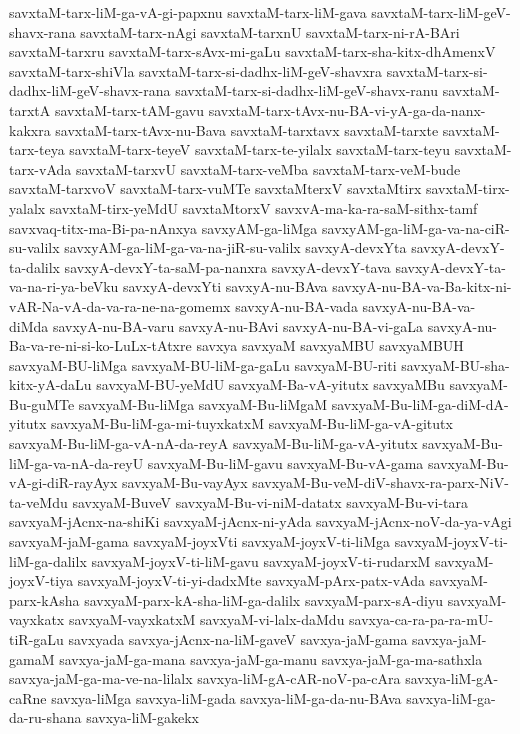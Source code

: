 {savxtaM-tarx-liM-ga-vA-gi-papxnu
savxtaM-tarx-liM-gava
savxtaM-tarx-liM-geV-shavx-rana
savxtaM-tarx-nAgi
savxtaM-tarxnU
savxtaM-tarx-ni-rA-BAri
savxtaM-tarxru
savxtaM-tarx-sAvx-mi-gaLu
savxtaM-tarx-sha-kitx-dhAmenxV
savxtaM-tarx-shiVla
savxtaM-tarx-si-dadhx-liM-geV-shavxra
savxtaM-tarx-si-dadhx-liM-geV-shavx-rana
savxtaM-tarx-si-dadhx-liM-geV-shavx-ranu
savxtaM-tarxtA
savxtaM-tarx-tAM-gavu
savxtaM-tarx-tAvx-nu-BA-vi-yA-ga-da-nanx-kakxra
savxtaM-tarx-tAvx-nu-Bava
savxtaM-tarxtavx
savxtaM-tarxte
savxtaM-tarx-teya
savxtaM-tarx-teyeV
savxtaM-tarx-te-yilalx
savxtaM-tarx-teyu
savxtaM-tarx-vAda
savxtaM-tarxvU
savxtaM-tarx-veMba
savxtaM-tarx-veM-bude
savxtaM-tarxvoV
savxtaM-tarx-vuMTe
savxtaMterxV
savxtaMtirx
savxtaM-tirx-yalalx
savxtaM-tirx-yeMdU
savxtaMtorxV
savxvA-ma-ka-ra-saM-sithx-tamf
savxvaq-titx-ma-Bi-pa-nAnxya
savxyAM-ga-liMga
savxyAM-ga-liM-ga-va-na-ciR-su-valilx
savxyAM-ga-liM-ga-va-na-jiR-su-valilx
savxyA-devxYta
savxyA-devxY-ta-dalilx
savxyA-devxY-ta-saM-pa-nanxra
savxyA-devxY-tava
savxyA-devxY-ta-va-na-ri-ya-beVku
savxyA-devxYti
savxyA-nu-BAva
savxyA-nu-BA-va-Ba-kitx-ni-vAR-Na-vA-da-va-ra-ne-na-gomemx
savxyA-nu-BA-vada
savxyA-nu-BA-va-diMda
savxyA-nu-BA-varu
savxyA-nu-BAvi
savxyA-nu-BA-vi-gaLa
savxyA-nu-Ba-va-re-ni-si-ko-LuLx-tAtxre
savxya
savxyaM
savxyaMBU
savxyaMBUH
savxyaM-BU-liMga
savxyaM-BU-liM-ga-gaLu
savxyaM-BU-riti
savxyaM-BU-sha-kitx-yA-daLu
savxyaM-BU-yeMdU
savxyaM-Ba-vA-yitutx
savxyaMBu
savxyaM-Bu-guMTe
savxyaM-Bu-liMga
savxyaM-Bu-liMgaM
savxyaM-Bu-liM-ga-diM-dA-yitutx
savxyaM-Bu-liM-ga-mi-tuyxkatxM
savxyaM-Bu-liM-ga-vA-gitutx
savxyaM-Bu-liM-ga-vA-nA-da-reyA
savxyaM-Bu-liM-ga-vA-yitutx
savxyaM-Bu-liM-ga-va-nA-da-reyU
savxyaM-Bu-liM-gavu
savxyaM-Bu-vA-gama
savxyaM-Bu-vA-gi-diR-rayAyx
savxyaM-Bu-vayAyx
savxyaM-Bu-veM-diV-shavx-ra-parx-NiV-ta-veMdu
savxyaM-BuveV
savxyaM-Bu-vi-niM-datatx
savxyaM-Bu-vi-tara
savxyaM-jAcnx-na-shiKi
savxyaM-jAcnx-ni-yAda
savxyaM-jAcnx-noV-da-ya-vAgi
savxyaM-jaM-gama
savxyaM-joyxVti
savxyaM-joyxV-ti-liMga
savxyaM-joyxV-ti-liM-ga-dalilx
savxyaM-joyxV-ti-liM-gavu
savxyaM-joyxV-ti-rudarxM
savxyaM-joyxV-tiya
savxyaM-joyxV-ti-yi-dadxMte
savxyaM-pArx-patx-vAda
savxyaM-parx-kAsha
savxyaM-parx-kA-sha-liM-ga-dalilx
savxyaM-parx-sA-diyu
savxyaM-vayxkatx
savxyaM-vayxkatxM
savxyaM-vi-lalx-daMdu
savxya-ca-ra-pa-ra-mU-tiR-gaLu
savxyada
savxya-jAcnx-na-liM-gaveV
savxya-jaM-gama
savxya-jaM-gamaM
savxya-jaM-ga-mana
savxya-jaM-ga-manu
savxya-jaM-ga-ma-sathxla
savxya-jaM-ga-ma-ve-na-lilalx
savxya-liM-gA-cAR-noV-pa-cAra
savxya-liM-gA-caRne
savxya-liMga
savxya-liM-gada
savxya-liM-ga-da-nu-BAva
savxya-liM-ga-da-ru-shana
savxya-liM-gakekx
}
